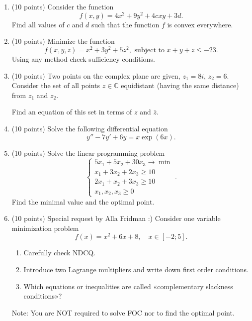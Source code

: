 \begin{enumerate}

  \item (10 points) Consider the function 
  \[
  f(x, y) = 4x^2 + 9y^2 + 4cxy + 3d.  
  \]
  Find all values of $c$ and $d$ such that the function $f$ is convex everywhere. 
  \item (10 points) Minimize the function 
  \[
  f(x, y, z) = x^2 + 3y^2 + 5z^2, \text{ subject to } x + y + z \leq -23.
  \]
  Using any method check sufficiency conditions. 
  \item (10 points) Two points on the complex plane are given, $z_1 = 8i$, $z_2 = 6$. 
  Consider the set of all points $z\in \mathbb{C}$ equidistant (having the same distance) from $z_1$ and $z_2$. 
  
  Find an equation of this set in terms of $z$ and $\bar z$. 
  
  \item (10 points) Solve the following differential equation
  \[
  y''-7y' + 6y = x \exp(6x).
  \]
  
  \item (10 points) Solve the linear programming problem 
  \[
  \begin{cases}
    5x_1 + 5x_2 + 30x_3 \to \min \\
    x_1 + 3x_2 + 2x_3 \geq 10 \\
    2x_1 + x_2 + 3x_3 \geq 10 \\
    x_1, x_2, x_3 \geq 0
  \end{cases}.
  \]
  Find the minimal value and the optimal point. 
  
  \item (10 points)  Special request by Alla Fridman :)
  Consider one variable minimization problem 
  \[
  f(x) = x^2 + 6x + 8, \quad x \in [-2; 5].  
  \]
  
  \begin{enumerate}
    \item Carefully check NDCQ. 
    \item Introduce two Lagrange multipliers and write down first order conditions. 
    \item Which equations or inequalities are called «complementary slackness conditions»?
  \end{enumerate}
  
  Note:   You are NOT required to solve FOC nor to find the optimal point. 
  
  

\end{enumerate}
